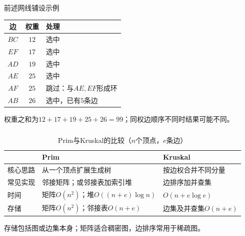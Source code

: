 \begin{frame}
    \frametitle{\insertsectionhead}
    \begin{exampleblock}{前述网线铺设示例}
        \begin{center}
            \begin{tabular}{c|c|l}
                \toprule
                边 & 权重 & 处理 \\
                \midrule
                $BC$ & $12$ & 选中 \\
                $EF$ & $17$ & 选中 \\
                $AD$ & $19$ & 选中 \\
                $AE$ & $25$ & 选中 \\
                $AF$ & $25$ & 跳过：与$AE,EF$形成环 \\
                $AB$ & $26$ & 选中，已有$5$条边 \\
                \bottomrule
            \end{tabular}
        \end{center}
        权重之和为$12+17+19+25+26=99$；同权边顺序不同时结果可能不同。
    \end{exampleblock}
\end{frame}

\begin{frame}
    \frametitle{\insertsectionhead}
    \begin{table}
        \centering
        \small
        \caption{Prim与Kruskal的比较（$n$个顶点，$e$条边）}
        \begin{tabular}{p{}p{}p{}}
            \toprule
            & Prim & Kruskal \\
            \midrule
            核心思路 & 从一个顶点扩展生成树 & 按边权合并不同分量 \\
            常见实现 & 邻接矩阵；或邻接表加索引堆 & 边排序加并查集 \\
            时间 & 矩阵$O(n^2)$；堆$O((n+e)\log n)$ & $O(n+e\log e)$ \\
            存储 & 矩阵$O(n^2)$；邻接表$O(n+e)$ & 边集及并查集$O(n+e)$ \\
            \bottomrule
        \end{tabular}
    \end{table}
    \small 存储包括图或边集本身；矩阵适合稠密图，边排序常用于稀疏图。
\end{frame}
